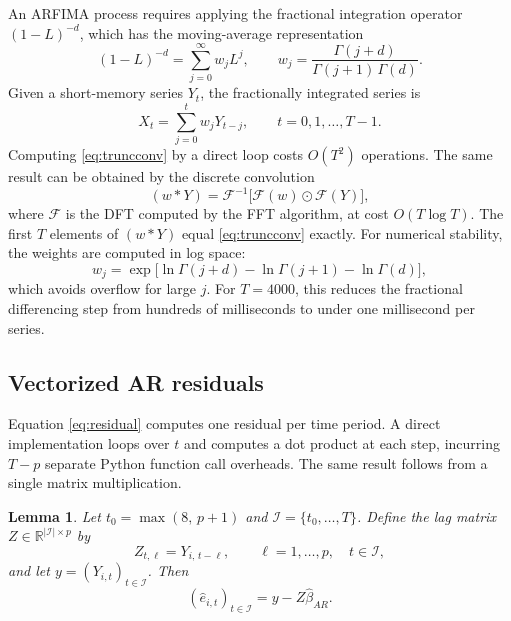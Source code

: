 \documentclass[12pt]{article}
\newtheorem{lemma}{Lemma}
\begin{document}
An ARFIMA process requires applying the fractional integration operator
$(1-L)^{-d}$, which has the moving-average representation
\begin{equation}
(1-L)^{-d} = \sum_{j=0}^{\infty} w_j L^j, \qquad
w_j = \frac{\Gamma(j+d)}{\Gamma(j+1)\,\Gamma(d)}.
\label{eq:fracweights}
\end{equation}
Given a short-memory series $Y_t$, the fractionally integrated series is
\begin{equation}
X_t = \sum_{j=0}^{t} w_j Y_{t-j}, \qquad t=0,1,\dots,T-1.
\label{eq:truncconv}
\end{equation}
Computing \eqref{eq:truncconv} by a direct loop costs $O(T^2)$ operations.
The same result can be obtained by the discrete convolution
\begin{equation}
(w*Y) = \mathcal{F}^{-1}\bigl[\mathcal{F}(w) \odot \mathcal{F}(Y)\bigr],
\label{eq:convthm}
\end{equation}
where $\mathcal{F}$ is the DFT computed by the FFT algorithm, at cost
$O(T\log T)$. The first $T$ elements of $(w*Y)$ equal \eqref{eq:truncconv}
exactly. For numerical stability, the weights are computed in log space:
\begin{equation}
w_j = \exp\bigl[\ln\Gamma(j+d) - \ln\Gamma(j+1) - \ln\Gamma(d)\bigr],
\label{eq:gammaln}
\end{equation}
which avoids overflow for large $j$. For $T=4000$, this reduces the
fractional differencing step from hundreds of milliseconds to under one
millisecond per series.

\subsection{Vectorized AR residuals}
\label{subsec:vectorAR}

Equation \eqref{eq:residual} computes one residual per time period. A
direct implementation loops over $t$ and computes a dot product at each
step, incurring $T-p$ separate Python function call overheads. The same
result follows from a single matrix multiplication.

\begin{lemma}
\label{lem:vector}
Let $t_0 = \max(8,\,p+1)$ and $\mathcal{I} = \{t_0,\dots,T\}$. Define
the lag matrix $Z \in \mathbb{R}^{|\mathcal{I}|\times p}$ by
\begin{equation}
Z_{t,\ell} = Y_{i,\,t-\ell}, \qquad \ell=1,\dots,p,\quad t\in\mathcal{I},
\label{eq:lagmatrix}
\end{equation}
and let $y = (Y_{i,t})_{t\in\mathcal{I}}$. Then
\begin{equation}
(\hat e_{i,t})_{t\in\mathcal{I}} = y - Z\hat\beta_{AR}.
\label{eq:vecresid}
\end{equation}
\end{lemma}
\end{document}
